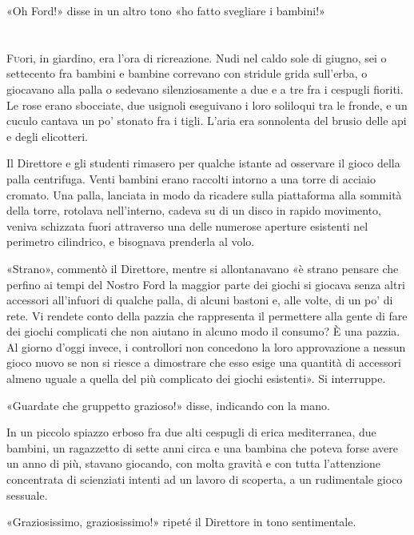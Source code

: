 \documentclass[
a5paper, %
10pt, %
twoside, 
onecolumn, %
openany, %
]{memoir}
\begin{document}
«Oh Ford!» disse in un altro tono «ho fatto svegliare i bambini!»

\chapter{\phantom{text}}

\lettrine{F}uori, in giardino, era l’ora di ricreazione. Nudi nel caldo sole di giugno, sei o settecento fra bambini e bambine correvano con stridule grida sull’erba, o giocavano alla palla o sedevano silenziosamente a due e a tre fra i cespugli fioriti. Le rose erano sbocciate, due usignoli eseguivano i loro soliloqui tra le fronde, e un cuculo cantava un po’ stonato fra i tigli. L’aria era sonnolenta del brusio delle api e degli elicotteri.

Il Direttore e gli studenti rimasero per qualche istante ad osservare il gioco della palla centrifuga. Venti bambini erano raccolti intorno a una torre di acciaio cromato. Una palla, lanciata in modo da ricadere sulla piattaforma alla sommità della torre, rotolava nell’interno, cadeva su di un disco in rapido movimento, veniva schizzata fuori attraverso una delle numerose aperture esistenti nel perimetro cilindrico, e bisognava prenderla al volo.

«Strano», commentò il Direttore, mentre si allontanavano «è strano pensare che perfino ai tempi del Nostro Ford la maggior parte dei giochi si giocava senza altri accessori all’infuori di qualche palla, di alcuni bastoni e, alle volte, di un po’ di rete. Vi rendete conto della pazzia che rappresenta il permettere alla gente di fare dei giochi complicati che non aiutano in alcuno modo il consumo? È una pazzia. Al giorno d’oggi invece, i controllori non concedono la loro approvazione a nessun gioco nuovo se non si riesce a dimostrare che esso esige una quantità di accessori almeno uguale a quella del più complicato dei giochi esistenti». Si interruppe.

«Guardate che gruppetto grazioso!» disse, indicando con la mano.

In un piccolo spiazzo erboso fra due alti cespugli di erica mediterranea, due bambini, un ragazzetto di sette anni circa e una bambina che poteva forse avere un anno di più, stavano giocando, con molta gravità e con tutta l’attenzione concentrata di scienziati intenti ad un lavoro di scoperta, a un rudimentale gioco sessuale.

«Graziosissimo, graziosissimo!» ripeté il Direttore in tono sentimentale.
\end{document}
